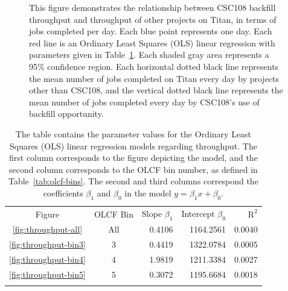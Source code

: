 \begin{figure}
  \caption{This figure demonstrates the relationship between CSC108 backfill
throughput and throughput of other projects on Titan, in terms of jobs
completed per day. Each blue point represents one day. Each red line is an
Ordinary Least Squares (OLS) linear regression with parameters given in
Table~\ref{tab:throughput-params}. Each shaded gray area represents a 95\%
confidence region. Each horizontal dotted black line represents the mean number
of jobs completed on Titan every day by projects other than CSC108, and the
vertical dotted black line represents the mean number of jobs completed every
day by CSC108's use of backfill opportunity.}
\end{figure}

\begin{table}
\caption{The table contains the parameter values for the Ordinary Least Squares
(OLS) linear regression models regarding throughput. The first column
corresponds to the figure depicting the model, and the second column
corresponds to the OLCF bin number, as defined in Table~\ref{tab:olcf-bins}.
The second and third columns correspond the coefficients $\beta_1$ and
$\beta_0$ in the model $y = \beta_{1}x + \beta_0$.}
\label{tab:throughput-params}       %
\begin{tabular}{ccrrr}
\hline\noalign{\smallskip}
Figure & OLCF Bin & Slope $\beta_1$  & Intercept $\beta_0$  &   $\text{R}^2$ \\
\noalign{\smallskip}\hline\noalign{\smallskip}
\ref{fig:throughput-all}    &   All &   0.4106  &   1164.2561   & 0.0040    \\
\ref{fig:throughput-bin3}   &   3   &   0.4419  &   1322.0784   & 0.0005    \\
\ref{fig:throughput-bin4}   &   4   &   1.9819  &   1211.3384   & 0.0027    \\
\ref{fig:throughput-bin5}   &   5   &   0.3072  &   1195.6684   & 0.0018    \\
\noalign{\smallskip}\hline
\end{tabular}
\end{table}

